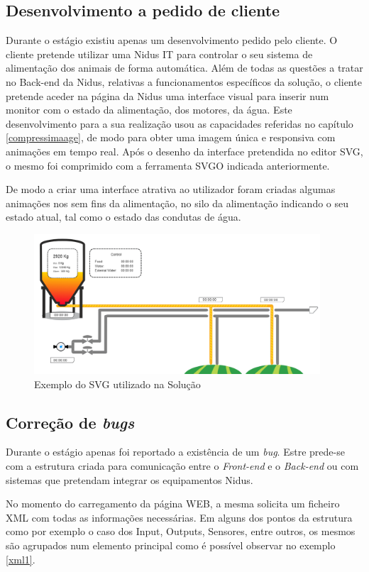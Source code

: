 \subsection{Desenvolvimento a pedido de cliente}

\par Durante o estágio existiu apenas um desenvolvimento pedido pelo cliente. O cliente pretende utilizar uma Nidus IT para controlar o seu sistema de alimentação dos animais de forma automática. Além de todas as questões a tratar no Back-end da Nidus, relativas a funcionamentos específicos da solução, o cliente pretende aceder na página da Nidus uma interface visual para inserir num monitor com o estado da alimentação, dos motores, da água. Este desenvolvimento para a sua realização usou as capacidades referidas no capítulo \ref{compressimaage}, de modo para obter uma imagem única e responsiva com animações em tempo real. Após o desenho da interface pretendida no editor SVG, o mesmo foi comprimido com a ferramenta SVGO indicada anteriormente. \par De modo a criar uma interface atrativa ao utilizador foram criadas algumas animações nos sem fins da alimentação, no silo da alimentação indicando o seu estado atual, tal como o estado das condutas de água.

\begin{figure}[ht]
\centering
\includegraphics[width=0.95\textwidth]{images/svgpig.png}
\caption{Exemplo do SVG utilizado na Solução}\label{pig}
\end{figure}

\subsection{Correção de \textit{bugs}}

\par Durante o estágio apenas foi reportado a existência de um \textit{bug}. Estre prede-se com a estrutura criada para comunicação entre o \textit{Front-end} e o \textit{Back-end} ou com sistemas que pretendam integrar os equipamentos Nidus.
\par No momento do carregamento da página WEB, a mesma solicita um ficheiro XML com todas as informações necessárias. Em alguns dos pontos da estrutura como por exemplo o caso dos Input, Outputs, Sensores, entre outros, os mesmos são agrupados num elemento principal como é possível observar no exemplo \ref{xml1}.


